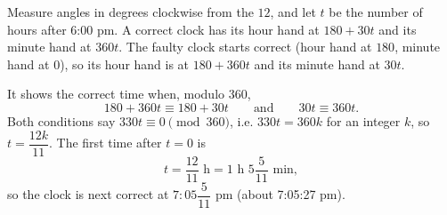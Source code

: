 Measure angles in degrees clockwise from the $12$, and let $t$ be the number of hours after 6:00 pm. A correct clock has its hour hand at $180+30t$ and its minute hand at $360t$. The faulty clock starts correct (hour hand at $180$, minute hand at $0$), so its hour hand is at $180+360t$ and its minute hand at $30t$.

It shows the correct time when, modulo $360$,
\[180+360t\equiv180+30t\qquad\text{and}\qquad30t\equiv360t.\]
Both conditions say $330t\equiv0\pmod{360}$, i.e. $330t=360k$ for an integer $k$, so $t=\dfrac{12k}{11}$. The first time after $t=0$ is
\[t=\dfrac{12}{11}\text{ h}=1\text{ h }5\dfrac5{11}\text{ min},\]
so the clock is next correct at $\boxed{7{:}05\dfrac5{11}\text{ pm}}$ (about 7:05:27 pm).

